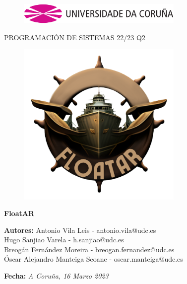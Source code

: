 \documentclass[a4paper,openright,12pt]{article}
\begin{document}
\begin{titlepage}

\begin{center}
\vspace*{-1in}
\begin{figure}[htb]
\begin{center}
\includegraphics[width=8cm]{udc.eps}
\end{center}
\end{figure}

\vspace*{1in}
PROGRAMACIÓN DE SISTEMAS 22/23 Q2\\
\begin{figure}[htb]
\begin{center}
\includegraphics[width=8cm]{icono.png}
\end{center}
\end{figure}
\begin{Large}
\textbf{FloatAR} \\
\end{Large}

\vspace*{1.5in}

\begin{large}
\raggedleft
\textbf{Autores:}
{Antonio Vila Leis - antonio.vila@udc.es\\Hugo Sanjiao Varela - h.sanjiao@udc.es\\Breogán Fernández Moreira - breogan.fernandez@udc.es\\Óscar Alejandro Manteiga Seoane - oscar.manteiga@udc.es\\}

\vspace{1in}

\textbf{Fecha:}\textit{ A Coruña, 16 Marzo 2023}\\
\end{large}

\end{center}
\end{titlepage} 
\end{document}
